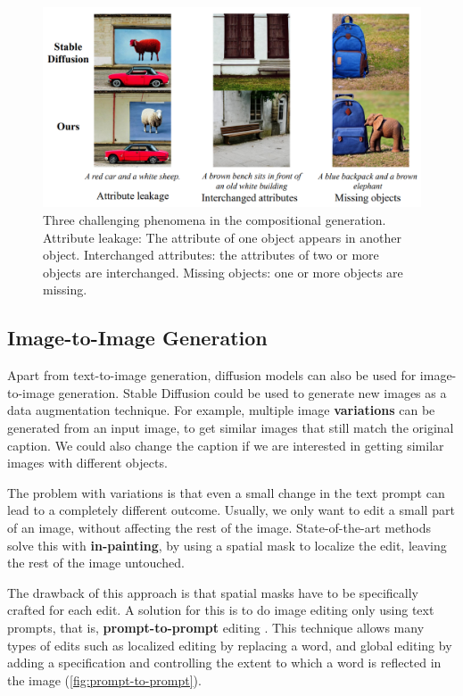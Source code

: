\begin{figure}[ht]
    \centering
    \includegraphics[width=\linewidth]{images/future/training-free.png}
    \caption{Three challenging phenomena in the compositional generation. Attribute leakage: The attribute of one object appears in another object. Interchanged attributes: the attributes of two or more objects are interchanged. Missing objects: one or more objects are missing.}
    \label{fig:training-free}
\end{figure}

\subsection{Image-to-Image Generation} \label{sec:image-to-image}

Apart from text-to-image generation, diffusion models can also be used for image-to-image generation. Stable Diffusion \cite{rombach2021highresolution} could be used to generate new images as a data augmentation technique. For example, multiple image \textbf{variations} can be generated from an input image, to get similar images that still match the original caption. We could also change the caption if we are interested in getting similar images with different objects. 

The problem with variations is that even a small change in the text prompt can lead to a completely different outcome. Usually, we only want to edit a small part of an image, without affecting the rest of the image. State-of-the-art methods solve this with \textbf{in-painting}, by using a spatial mask to localize the edit, leaving the rest of the image untouched.

The drawback of this approach is that spatial masks have to be specifically crafted for each edit. A solution for this is to do image editing only using text prompts, that is, \textbf{prompt-to-prompt} editing \cite{hertz2022prompt}. This technique allows many types of edits such as localized editing by replacing a word, and global editing by adding a specification and controlling the extent to which a word is reflected in the image (\cref{fig:prompt-to-prompt}).

